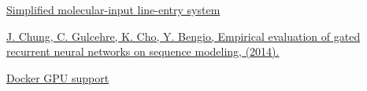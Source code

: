 \documentclass[a4paper]{article}
\begin{document}
\begin{thebibliography}{1}

\href{https://en.wikipedia.org/wiki/Simplified_molecular-input_line-entry_system/}{Simplified molecular-input line-entry system}

\href{http://arxiv.org/abs/1412.3555/}{J. Chung, C. Gulcehre, K. Cho, Y. Bengio, Empirical evaluation of gated recurrent neural networks on sequence modeling, (2014).}

\href{https://docs.docker.com/compose/gpu-support/}{Docker GPU support}

\end{thebibliography}
\end{document}
